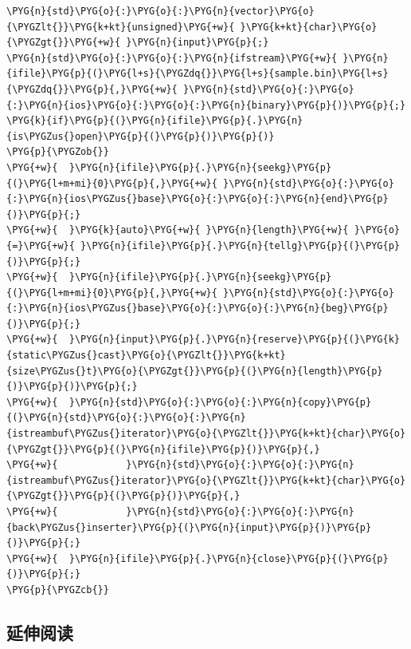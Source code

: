 \begin{itemize}
\begin{codeblockbg}
\begin{Verbatim}[commandchars=\\\{\},breaklines=true,breakanywhere=true,fontsize=\codefont,xleftmargin=17bp]
\PYG{n}{std}\PYG{o}{:}\PYG{o}{:}\PYG{n}{vector}\PYG{o}{\PYGZlt{}}\PYG{k+kt}{unsigned}\PYG{+w}{ }\PYG{k+kt}{char}\PYG{o}{\PYGZgt{}}\PYG{+w}{ }\PYG{n}{input}\PYG{p}{;}
\PYG{n}{std}\PYG{o}{:}\PYG{o}{:}\PYG{n}{ifstream}\PYG{+w}{ }\PYG{n}{ifile}\PYG{p}{(}\PYG{l+s}{\PYGZdq{}}\PYG{l+s}{sample.bin}\PYG{l+s}{\PYGZdq{}}\PYG{p}{,}\PYG{+w}{ }\PYG{n}{std}\PYG{o}{:}\PYG{o}{:}\PYG{n}{ios}\PYG{o}{:}\PYG{o}{:}\PYG{n}{binary}\PYG{p}{)}\PYG{p}{;}
\PYG{k}{if}\PYG{p}{(}\PYG{n}{ifile}\PYG{p}{.}\PYG{n}{is\PYGZus{}open}\PYG{p}{(}\PYG{p}{)}\PYG{p}{)}
\PYG{p}{\PYGZob{}}
\PYG{+w}{  }\PYG{n}{ifile}\PYG{p}{.}\PYG{n}{seekg}\PYG{p}{(}\PYG{l+m+mi}{0}\PYG{p}{,}\PYG{+w}{ }\PYG{n}{std}\PYG{o}{:}\PYG{o}{:}\PYG{n}{ios\PYGZus{}base}\PYG{o}{:}\PYG{o}{:}\PYG{n}{end}\PYG{p}{)}\PYG{p}{;}
\PYG{+w}{  }\PYG{k}{auto}\PYG{+w}{ }\PYG{n}{length}\PYG{+w}{ }\PYG{o}{=}\PYG{+w}{ }\PYG{n}{ifile}\PYG{p}{.}\PYG{n}{tellg}\PYG{p}{(}\PYG{p}{)}\PYG{p}{;}
\PYG{+w}{  }\PYG{n}{ifile}\PYG{p}{.}\PYG{n}{seekg}\PYG{p}{(}\PYG{l+m+mi}{0}\PYG{p}{,}\PYG{+w}{ }\PYG{n}{std}\PYG{o}{:}\PYG{o}{:}\PYG{n}{ios\PYGZus{}base}\PYG{o}{:}\PYG{o}{:}\PYG{n}{beg}\PYG{p}{)}\PYG{p}{;}
\PYG{+w}{  }\PYG{n}{input}\PYG{p}{.}\PYG{n}{reserve}\PYG{p}{(}\PYG{k}{static\PYGZus{}cast}\PYG{o}{\PYGZlt{}}\PYG{k+kt}{size\PYGZus{}t}\PYG{o}{\PYGZgt{}}\PYG{p}{(}\PYG{n}{length}\PYG{p}{)}\PYG{p}{)}\PYG{p}{;}
\PYG{+w}{  }\PYG{n}{std}\PYG{o}{:}\PYG{o}{:}\PYG{n}{copy}\PYG{p}{(}\PYG{n}{std}\PYG{o}{:}\PYG{o}{:}\PYG{n}{istreambuf\PYGZus{}iterator}\PYG{o}{\PYGZlt{}}\PYG{k+kt}{char}\PYG{o}{\PYGZgt{}}\PYG{p}{(}\PYG{n}{ifile}\PYG{p}{)}\PYG{p}{,}
\PYG{+w}{            }\PYG{n}{std}\PYG{o}{:}\PYG{o}{:}\PYG{n}{istreambuf\PYGZus{}iterator}\PYG{o}{\PYGZlt{}}\PYG{k+kt}{char}\PYG{o}{\PYGZgt{}}\PYG{p}{(}\PYG{p}{)}\PYG{p}{,}
\PYG{+w}{            }\PYG{n}{std}\PYG{o}{:}\PYG{o}{:}\PYG{n}{back\PYGZus{}inserter}\PYG{p}{(}\PYG{n}{input}\PYG{p}{)}\PYG{p}{)}\PYG{p}{;}
\PYG{+w}{  }\PYG{n}{ifile}\PYG{p}{.}\PYG{n}{close}\PYG{p}{(}\PYG{p}{)}\PYG{p}{;}
\PYG{p}{\PYGZcb{}}
\end{Verbatim}
\end{codeblockbg}

\end{itemize}



\subsection{延伸阅读}


